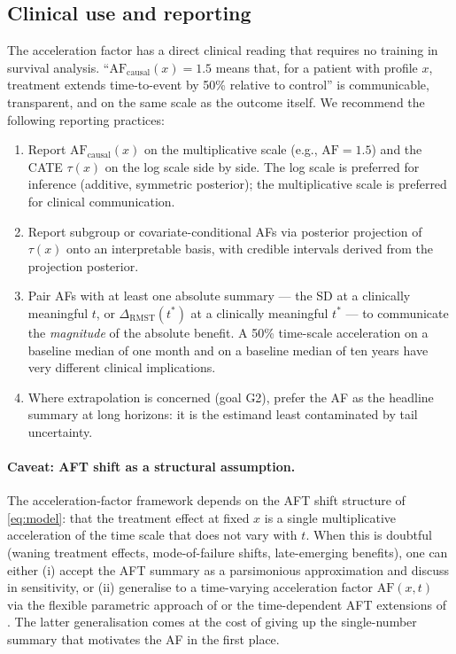 \documentclass[11pt]{article}
\theoremstyle{plain}
\theoremstyle{definition}
\theoremstyle{remark}
\newcommand{\1}{\mathds{1}}
\newcommand{\tauf}{\tau}
\newcommand{\RMST}{\mathrm{RMST}}
\newcommand{\AF}{\mathrm{AF}}
\begin{document}
\subsection{Clinical use and reporting}

The acceleration factor has a direct clinical reading that requires no
training in survival analysis. ``$\AF_{\mathrm{causal}}(x) = 1.5$ means
that, for a patient with profile $x$, treatment extends time-to-event by
50\% relative to control'' is communicable, transparent, and on the same
scale as the outcome itself. We recommend the following reporting
practices:

\begin{enumerate}[leftmargin=*]
  \item Report $\AF_{\mathrm{causal}}(x)$ on the multiplicative scale
        (e.g., $\AF = 1.5$) and the CATE $\tauf(x)$ on the log scale
        side by side. The log scale is preferred for inference (additive,
        symmetric posterior); the multiplicative scale is preferred for
        clinical communication.
  \item Report subgroup or covariate-conditional AFs via posterior
        projection of $\tauf(x)$ onto an interpretable basis, with
        credible intervals derived from the projection posterior.
  \item Pair AFs with at least one absolute summary --- the SD at a
        clinically meaningful $t$, or $\Delta_{\RMST}(t^{*})$ at a
        clinically meaningful $t^{*}$ --- to communicate the
        \emph{magnitude} of the absolute benefit. A 50\% time-scale
        acceleration on a baseline median of one month and on a baseline
        median of ten years have very different clinical implications.
  \item Where extrapolation is concerned (goal G2), prefer the AF as the
        headline summary at long horizons: it is the estimand least
        contaminated by tail uncertainty.
\end{enumerate}

\paragraph{Caveat: AFT shift as a structural assumption.}
The acceleration-factor framework depends on the AFT shift structure of
\eqref{eq:model}: that the treatment effect at fixed $x$ is a single
multiplicative acceleration of the time scale that does not vary with
$t$. When this is doubtful (waning treatment effects, mode-of-failure
shifts, late-emerging benefits), one can either (i) accept the AFT
summary as a parsimonious approximation and discuss in sensitivity, or
(ii) generalise to a time-varying acceleration factor
$\AF(x, t)$ via the flexible parametric approach of
\citet{Crowther2023} or the time-dependent AFT extensions of
\citet{pang2021flexible}. The latter generalisation comes at the cost of giving
up the single-number summary that motivates the AF in the first place.
\end{document}
